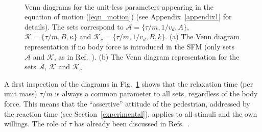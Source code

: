 \documentclass[preprint,12pt]{elsarticle}
\begin{document}
\begin{figure}[!htbp]
\centering
 
\hfill    
{}\\
\caption[width=0.47\columnwidth]{Venn diagrams for the unit-less parameters
appearing in the equation of motion (\ref{eqn_motion}) (see 
Appendix~\ref{appendix1} for details). The sets correspond to 
$\mathcal{A}=\{\tau/m,1/v_d,A\}$, $\mathcal{K}=\{\tau/m,B,\kappa\}$ and 
$\mathcal{K}_c=\{\tau/m,1/v_d,B,k\}$. (a) The Venn diagram representation if no 
body force is introduced in the SFM (only sets $\mathcal{A}$ and $\mathcal{K}$, 
as in Ref.~\cite{dorso_2019}). (b) The Venn diagram representation for the sets 
$\mathcal{A}$, $\mathcal{K}$ and $\mathcal{K}_c$. }
\label{venn_diagram}
\end{figure}

A first inspection of the diagrams in Fig.~\ref{venn_diagram} shows that the 
relaxation time (per unit mass) $\tau/m$ is always a common parameter to all 
sets, regardless of the body force. This means that the ``assertive'' attitude 
of the pedestrian, addressed by the reaction time (see 
Section~\ref{experimental}), applies to all stimuli and the own willings. The 
role of $\tau$ has already been discussed in 
Refs.~\cite{johansson_2009,dorso_2019}.    \\ 
\end{document}
